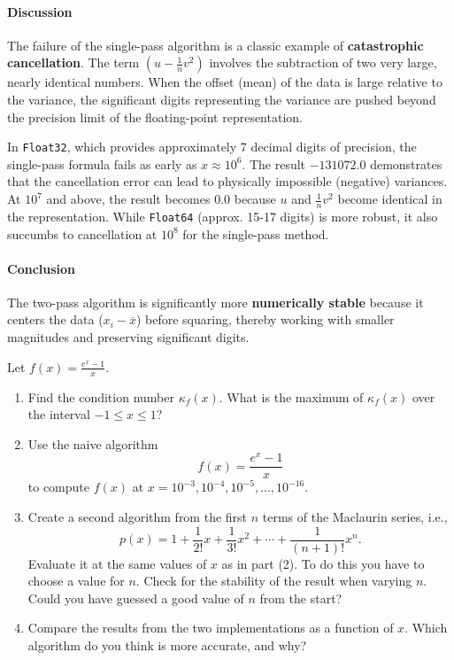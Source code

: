\begin{solution}
  \paragraph{Discussion}
  The failure of the single-pass algorithm is a classic example of \textbf{catastrophic cancellation}. The term $(u - \frac{1}{n}v^2)$ involves the subtraction of two very large, nearly identical numbers. When the offset (mean) of the data is large relative to the variance, the significant digits representing the variance are pushed beyond the precision limit of the floating-point representation.

  In \texttt{Float32}, which provides approximately 7 decimal digits of precision, the single-pass formula fails as early as $x \approx 10^6$. The result $-131072.0$ demonstrates that the cancellation error can lead to physically impossible (negative) variances. At $10^7$ and above, the result becomes $0.0$ because $u$ and $\frac{1}{n}v^2$ become identical in the representation. While \texttt{Float64} (approx. 15-17 digits) is more robust, it also succumbs to cancellation at $10^8$ for the single-pass method.

  \paragraph{Conclusion}
  The two-pass algorithm is significantly more \textbf{numerically stable} because it centers the data ($x_i - \overline{x}$) before squaring, thereby working with smaller magnitudes and preserving significant digits.
\end{solution}

\begin{exercise}
    Let \(f(x) = \frac{e^x-1}{x}\).
    \begin{enumerate}
        \item Find the condition number $\kappa_f(x)$. What is the maximum of $\kappa_f(x)$ over the interval \(-1\le x \le 1\)?
        \item Use the naive algorithm
            \[
                f(x)= \frac{e^{x}-1}{x}
            \]
            to compute \(f(x)\) at \(x=10^{-3},10^{-4},10^{-5},\ldots,10^{-16}\).  
        \item Create a second algorithm from the first $n$ terms of the Maclaurin series, i.e.,
            \[
                p(x) = 1 + \frac{1}{2!}x + \frac{1}{3!}x^2 + \cdots + \frac{1}{(n+1)!}x^n.
            \]
            Evaluate it at the same values of $x$ as in part (2). To do this you have to choose a value for $n$. Check for the stability of the result when varying $n$. Could you have guessed a good value of $n$ from the start? 
        \item Compare the results from the two implementations as a function of $x$. Which algorithm do you think is more accurate, and why?
    \end{enumerate}
\end{exercise}

